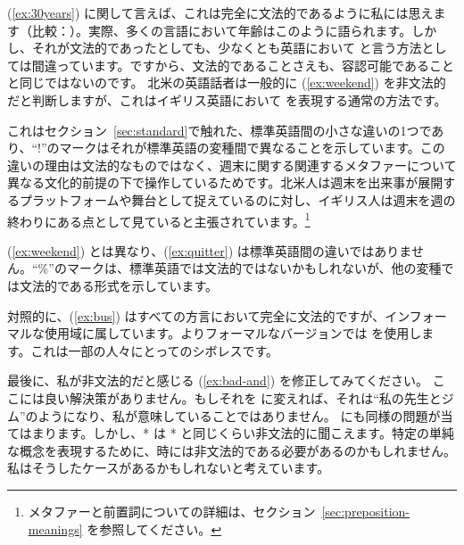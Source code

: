 (\ref{ex:30years}) に関して言えば、これは完全に文法的であるように私には思えます（比較：）。実際、多くの言語において年齢はこのように語られます。しかし、それが文法的であったとしても、少なくとも英語において  と言う方法としては間違っています。ですから、文法的であることさえも、容認可能であることと同じではないのです。
\label{ex:30years}
\z
北米の英語話者は一般的に (\ref{ex:weekend}) を非文法的だと判断しますが、これはイギリス英語において  を表現する通常の方法です。

\label{ex:weekend}
\z
これはセクション~\ref{sec:standard}で触れた、標準英語間の小さな違いの1つであり、\enquote{!}のマークはそれが標準英語の変種間で異なることを示しています。この違いの理由は文法的なものではなく、週末に関する関連するメタファーについて異なる文化的前提の下で操作しているためです。北米人は週末を出来事が展開するプラットフォームや舞台として捉えているのに対し、イギリス人は週末を週の終わりにある点として見ていると主張されています。\footnote{メタファーと前置詞についての詳細は、セクション~\ref{sec:preposition-meanings} を参照してください。}

\label{ex:quitter}
\z
(\ref{ex:weekend}) とは異なり、(\ref{ex:quitter}) は標準英語間の違いではありません。\enquote{\%}のマークは、標準英語では文法的ではないかもしれないが、他の変種では文法的である形式を示しています。

\label{ex:bus}
\z
対照的に、(\ref{ex:bus}) はすべての方言において完全に文法的ですが、インフォーマルな使用域に属しています。よりフォーマルなバージョンでは  を使用します。これは一部の人々にとってのシボレスです。

最後に、私が非文法的だと感じる (\ref{ex:bad-and}) を修正してみてください。
\label{ex:bad-and}
\z
ここには良い解決策がありません。もしそれを  に変えれば、それは\enquote{私の先生とジム}のようになり、私が意味していることではありません。 にも同様の問題が当てはまります。しかし、* は * と同じくらい非文法的に聞こえます。特定の単純な概念を表現するために、時には非文法的である必要があるのかもしれません。私はそうしたケースがあるかもしれないと考えています。

